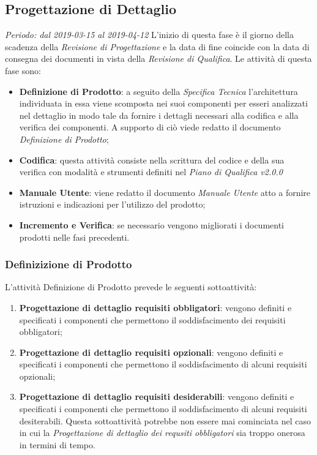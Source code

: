 \subsection{Progettazione di Dettaglio}
\textit{Periodo: dal 2019-03-15 al 2019-04-12}
L'inizio di questa fase è il giorno della scadenza della \textit{Revisione di 
Progettazione} e la data di fine coincide con la data di consegna dei documenti 
in vista della \textit{Revisione di Qualifica}. Le attività di questa fase sono:
\begin{itemize}
	\item \textbf{Definizione di Prodotto}: a seguito della \textit{Specifica 
	Tecnica} l'architettura individuata in essa viene scomposta nei suoi 
	componenti per esseri analizzati nel dettaglio in modo tale da fornire i 
	dettagli necessari alla codifica e alla verifica dei componenti. A supporto 
	di ciò viede redatto il documento \textit{Definizione di Prodotto};
	\item \textbf{Codifica}: questa attività consiste nella scrittura del 
	codice e della sua verifica con modalità e strumenti definiti nel 
	\textit{Piano di Qualifica v2.0.0}
	\item \textbf{Manuale Utente}: viene redatto il documento \textit{Manuale 
	Utente} atto a fornire istruzioni e indicazioni per l'utilizzo del prodotto;
	\item \textbf{Incremento e Verifica}: se necessario vengono migliorati i 
	documenti prodotti nelle fasi precedenti.
\end{itemize}

\subsubsection{Definizizione di Prodotto}
L'attività Definizione di Prodotto prevede le seguenti sottoattività:
\begin{enumerate}
	\item \textbf{Progettazione di dettaglio requisiti obbligatori}: vengono 
	definiti e specificati i componenti che permettono il soddisfacimento dei 
	requisiti obbligatori;
	\item \textbf{Progettazione di dettaglio requisiti opzionali}: vengono 
	definiti e specificati i componenti che permettono il soddisfacimento di 
	alcuni requisiti opzionali;
	\item \textbf{Progettazione di dettaglio requisiti desiderabili}: vengono	
	definiti e specificati i componenti che permettono il soddisfacimento di 
	alcuni requisiti desiterabili. Questa sottoattività potrebbe non essere mai 
	cominciata nel caso in cui la \textit{Progettazione di dettaglio dei 
	requsiti obbligatori} sia troppo onerosa in termini di tempo.
\end{enumerate}




